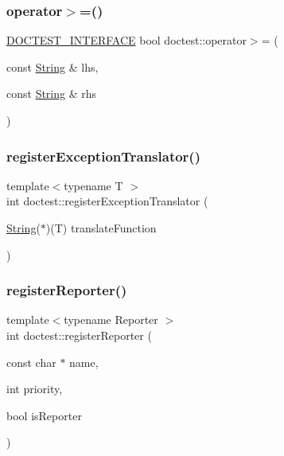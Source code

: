 \mbox{\label{namespacedoctest_ac32accb42e937cf870de2f6865ea236a}} 
\subsubsection{\texorpdfstring{operator$>$=()}{operator>=()}}
{\footnotesize\ttfamily \hyperlink{doctest_8h_a9c16ffc635ec47f07797d21ede26b1a5}{D\+O\+C\+T\+E\+S\+T\+\_\+\+I\+N\+T\+E\+R\+F\+A\+CE} bool doctest\+::operator$>$= (\begin{DoxyParamCaption}\item[{const \hyperlink{classdoctest_1_1String}{String} \&}]{lhs,  }\item[{const \hyperlink{classdoctest_1_1String}{String} \&}]{rhs }\end{DoxyParamCaption})}

\mbox{\label{namespacedoctest_a8e23e6bb4c6982688652060dbe41385d}} 
\subsubsection{\texorpdfstring{register\+Exception\+Translator()}{registerExceptionTranslator()}}
{\footnotesize\ttfamily template$<$typename T $>$ \\
int doctest\+::register\+Exception\+Translator (\begin{DoxyParamCaption}\item[{\hyperlink{classdoctest_1_1String}{String}($\ast$)(T)}]{translate\+Function }\end{DoxyParamCaption})}

\mbox{\label{namespacedoctest_a9e878a811f7bf0a615b3a39de3004673}} 
\subsubsection{\texorpdfstring{register\+Reporter()}{registerReporter()}}
{\footnotesize\ttfamily template$<$typename Reporter $>$ \\
int doctest\+::register\+Reporter (\begin{DoxyParamCaption}\item[{const char $\ast$}]{name,  }\item[{int}]{priority,  }\item[{bool}]{is\+Reporter }\end{DoxyParamCaption})}

